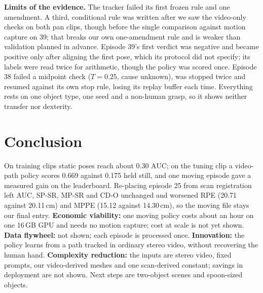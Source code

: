\documentclass[10pt, logo, copyright, anonymous]{nvidiaextabstract}
\begin{document}
\textbf{Limits of the evidence.} The tracker failed its first frozen rule
and one amendment. A third, conditional rule was written after we saw the
video-only checks on both pan clips, though before the single comparison
against motion capture on 39; that breaks our own one-amendment rule and is
weaker than validation planned in advance. Episode 39's first verdict was
negative and became positive only after aligning the first pose, which its
protocol did not specify; its labels were read twice for arithmetic, though
the policy was scored once. Episode 38 failed a midpoint check ($T=0.25$,
cause unknown), was stopped twice and resumed against its own stop rule,
losing its replay buffer each time. Everything rests on one object type, one
seed and a non-human grasp, so it shows neither transfer nor dexterity.

\section{Conclusion}
On training clips static poses reach about 0.30 AUC; on the tuning clip a
video-path policy scores 0.669 against 0.175 held still, and one moving
episode gave a measured gain on the leaderboard. Re-placing episode 25 from
scan registration left AUC, SP-SR, MP-SR and CD-O unchanged and worsened
RPE (20.71 against 20.11\,cm) and MPPE (15.12 against 14.30\,cm), so the
moving file stays our final entry.
\textbf{Economic viability:} one moving policy costs about an hour on one
16\,GB GPU and needs no motion capture; cost at scale is not yet shown. \textbf{Data flywheel:} not shown; each episode is processed once.
\textbf{Innovation:} the policy learns from a path tracked in ordinary
stereo video, without recovering the human hand. \textbf{Complexity
reduction:} the inputs are stereo video, fixed prompts, our video-derived
meshes and one scan-derived constant; savings in deployment are not shown. Next steps are two-object scenes and spoon-sized objects.

\par\label{maintextend}
\clearpage
\thispagestyle{plain}


\end{document}
